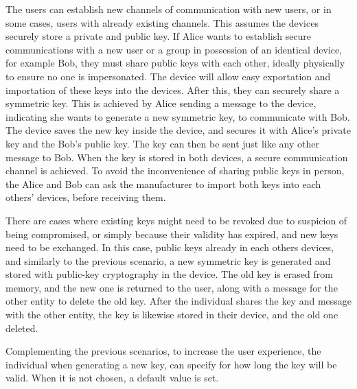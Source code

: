 The users can establish new channels of communication with new users, or in some cases, users with already existing channels. This assumes the devices securely store a private and public key.
If Alice wants to establish secure communications with a new user or a group in possession of an identical device, for example Bob, they must share public keys with each other, ideally physically to ensure no one is impersonated. The device will allow easy exportation and importation of these keys into the devices. After this, they can securely share a symmetric key. This is achieved by Alice sending a message to the device, indicating she wants to generate a new symmetric key, to communicate with Bob. The device saves the new key inside the device, and secures it with Alice's private key and the Bob's public key. The key can then be sent just like any other message to Bob. When the key is stored in both devices, a secure communication channel is achieved.
To avoid the inconvenience of sharing public keys in person, the Alice and Bob can ask the manufacturer to import both keys into each others' devices, before receiving them.

There are cases where existing keys might need to be revoked due to suspicion of being compromised, or simply because their validity has expired, and new keys need to be exchanged. In this case, public keys already in each others devices, and similarly to the previous scenario, a new symmetric key is generated and stored with public-key cryptography in the device. The old key is erased from memory, and the new one is returned to the user, along with a message for the other entity to delete the old key. After the individual shares the key and message with the other entity, the key is likewise stored in their device, and the old one deleted.

Complementing the previous scenarios, to increase the user experience, the individual when generating a new key, can specify for how long the key will be valid. When it is not chosen, a default value is set.
